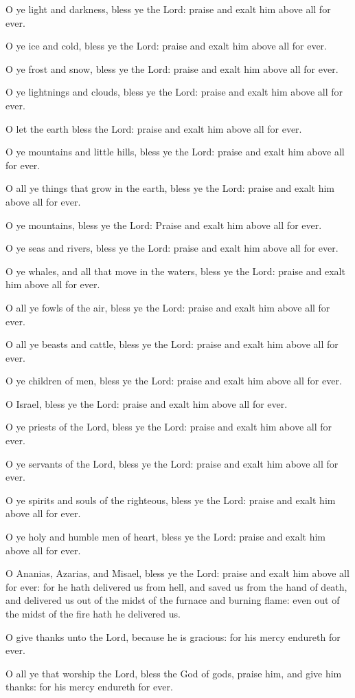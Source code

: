 {\par }{\PP {}O ye light and darkness, bless ye the Lord: praise and exalt him above all for ever.
\par }{\PP {}O ye ice and cold, bless ye the Lord: praise and exalt him above all for ever.
\par }{\PP {}O ye frost and snow, bless ye the Lord: praise and exalt him above all for ever.
\par }{\PP {}O ye lightnings and clouds, bless ye the Lord: praise and exalt him above all for ever.
\par }{\PP {}O let the earth bless the Lord: praise and exalt him above all for ever.
\par }{\PP {}O ye mountains and little hills, bless ye the Lord: praise and exalt him above all for ever.
\par }{\PP {}O all ye things that grow in the earth, bless ye the Lord: praise and exalt him above all for ever.
\par }{\PP {}O ye mountains, bless ye the Lord: Praise and exalt him above all for ever.
\par }{\PP {}O ye seas and rivers, bless ye the Lord: praise and exalt him above all for ever.
\par }{\PP {}O ye whales, and all that move in the waters, bless ye the Lord: praise and exalt him above all for ever.
\par }{\PP {}O all ye fowls of the air, bless ye the Lord: praise and exalt him above all for ever.
\par }{\PP {}O all ye beasts and cattle, bless ye the Lord: praise and exalt him above all for ever.
\par }{\PP {}O ye children of men, bless ye the Lord: praise and exalt him above all for ever.
\par }{\PP {}O Israel, bless ye the Lord: praise and exalt him above all for ever.
\par }{\PP {}O ye priests of the Lord, bless ye the Lord: praise and exalt him above all for ever.
\par }{\PP {}O ye servants of the Lord, bless ye the Lord: praise and exalt him above all for ever.
\par }{\PP {}O ye spirits and souls of the righteous, bless ye the Lord: praise and exalt him above all for ever.
\par }{\PP {}O ye holy and humble men of heart, bless ye the Lord: praise and exalt him above all for ever.
\par }{\PP {}O Ananias, Azarias, and Misael, bless ye the Lord: praise and exalt him above all for ever: for he hath delivered us from hell, and saved us from the hand of death, and delivered us out of the midst of the furnace and burning flame: even out of the midst of the fire hath he delivered us.
\par }{\PP {}O give thanks unto the Lord, because he is gracious: for his mercy endureth for ever.
\par }{\PP {}O all ye that worship the Lord, bless the God of gods, praise him, and give him thanks: for his mercy endureth for ever.
\par }